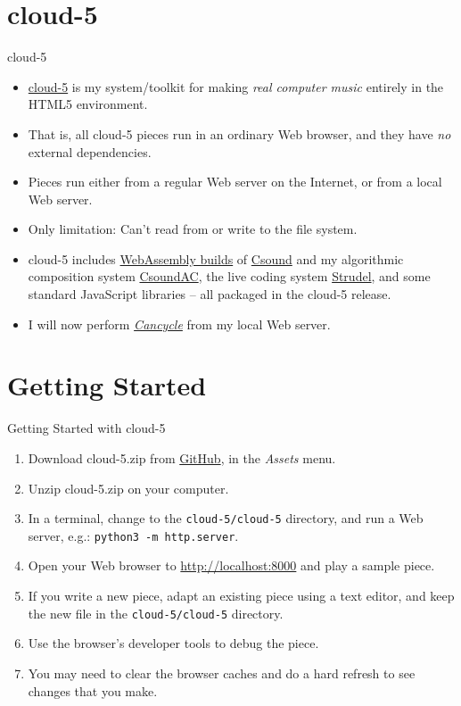 \documentclass{beamer}
\begin{document}
\section{cloud-5}
\begin{frame}{cloud-5}

\begin{itemize}
\item \href{https://gogins.github.io/cloud-5.html}{cloud-5} is my system/toolkit for making \emph{real computer music} entirely in the HTML5 environment.
\item That is, all cloud-5 pieces run in an ordinary Web browser, and they have \emph{no} external dependencies.
\item Pieces run either from a regular Web server on the Internet, or from a local Web server.
\item Only limitation: Can't read from or write to the file system.
\item cloud-5 includes \href{https://github.com/gogins/csound-wasm}{WebAssembly builds} of \href{http://csound.github.io}{Csound} and my algorithmic composition system \href{https://github.com/gogins/csound-ac}{CsoundAC}, the live coding system \href{https://github.com/tidalcycles/strudel}{Strudel}, and some standard JavaScript libraries -- all packaged in the cloud-5 release.
\item I will now perform \href{http://localhost:8000/cancycle.html}{\emph{Cancycle}} from my local Web server.
\end{itemize}

\end{frame}

\section{Getting Started}
\begin{frame}{Getting Started with cloud-5}

\begin{enumerate}
\item Download cloud-5.zip from \href{https://github.com/gogins/cloud-5/releases}{GitHub}, in the \emph{Assets} menu.
\item Unzip cloud-5.zip on your computer.
\item In a terminal, change to the \texttt{cloud-5/cloud-5} directory, and run a Web server, e.g.: \texttt{python3 -m http.server}.
\item Open your Web browser to \url{http://localhost:8000} and play a sample piece.
\item If you write a new piece, adapt an existing piece using a text editor, and keep the new file in the  \texttt{cloud-5/cloud-5} directory.
\item Use the browser's developer tools to debug the piece.
\item You may need to clear the browser caches and do a hard refresh to see changes that you make.
\end{enumerate}

\end{frame}
\end{document}
